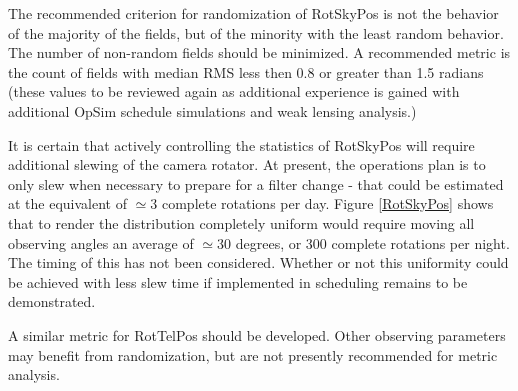The recommended criterion for randomization of RotSkyPos is not the behavior of the majority of the fields, but of the minority with the least random behavior.  The number of non-random fields should be minimized.  A recommended metric is the count of fields with median RMS less then 0.8 or greater than 1.5 radians (these values to be reviewed again as additional experience is gained with additional OpSim schedule simulations and weak lensing analysis.)

It is certain that actively controlling the statistics of RotSkyPos will require additional slewing of the camera rotator.  At present, the operations plan is to only slew when necessary to prepare for a filter change - that could be estimated at the equivalent of $\simeq 3$ complete rotations per day.  Figure \ref{RotSkyPos} shows that to render the distribution completely uniform would require moving all observing angles an average of $\simeq 30$ degrees, or 300 complete rotations per night.  The timing of this has not been considered.  Whether or not this uniformity could be achieved with less slew time if implemented in scheduling remains to be demonstrated.

A similar metric for RotTelPos should be developed. Other observing parameters may benefit from randomization, but are not presently recommended for metric analysis.